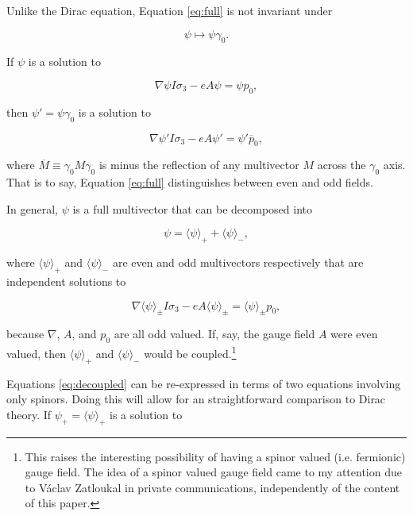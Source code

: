 \documentclass[twocolumn]{article}
\begin{document}
  Unlike the Dirac equation, Equation \ref{eq:full} is not invariant under

  \begin{equation}
    \psi \mapsto \psi \gamma_0.\label{eq:g0conjugation}
  \end{equation}

  If $\psi$ is a solution to

  \begin{equation}
    \nabla \psi I \sigma_3 - e A \psi = \psi p_0,\label{eq:plus}
  \end{equation}

  then $\psi' = \psi \gamma_0$ is a solution to

  \begin{equation}
    \nabla \psi' I \sigma_3 - e A \psi' = \psi' \overline p_0, \label{eq:minus}
  \end{equation}

  where $\overline M \equiv \gamma_0 M\gamma_0$ is minus the reflection of any multivector $M$ across the $\gamma_0$ axis. That is to say, Equation \ref{eq:full} distinguishes between even and odd fields. 

  In general, $\psi$ is a full multivector that can be decomposed into

  \begin{equation}
    \psi = \langle \psi \rangle_+ + \langle \psi \rangle_-,
  \end{equation}

  where $\langle \psi \rangle_+$ and $\langle \psi \rangle_-$ are even and odd multivectors respectively that are independent solutions to

  \begin{equation}
    \nabla \langle \psi \rangle_\pm I \sigma_3 - e A \langle \psi \rangle_\pm = \langle \psi \rangle_\pm p_0,\label{eq:decoupled}
  \end{equation}

  because $\nabla$, $A$, and $p_0$ are all odd valued. If, say, the gauge field $A$ were even valued, then $\langle \psi \rangle_+$ and $\langle \psi \rangle_-$ would be coupled.\footnote{This raises the interesting possibility of having a spinor valued (i.e. fermionic) gauge field. The idea of a spinor valued gauge field came to my attention due to V\'aclav Zatloukal in private communications, independently of the content of this paper.}

  Equations \ref{eq:decoupled} can be re-expressed in terms of two equations involving only spinors. Doing this will allow for an straightforward comparison to Dirac theory. If $\psi_+ = \langle \psi \rangle_+$ is a solution to
\end{document}

